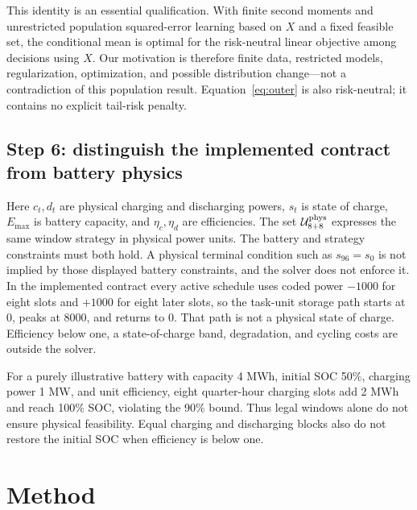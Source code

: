 \documentclass[11pt,a4paper]{article}
\begin{document}
\EqBayes
This identity is an essential qualification. With finite second moments and unrestricted population squared-error learning based on $X$ and a fixed feasible set, the conditional mean is optimal for the risk-neutral linear objective among decisions using $X$. Our motivation is therefore finite data, restricted models, regularization, optimization, and possible distribution change---not a contradiction of this population result. Equation~\eqref{eq:outer} is also risk-neutral; it contains no explicit tail-risk penalty.

\subsection{Step 6: distinguish the implemented contract from battery physics}
\EqPhysical
Here $c_t,d_t$ are physical charging and discharging powers, $s_t$ is state of charge, $E_{\max}$ is battery capacity, and $\eta_c,\eta_d$ are efficiencies. The set $\mathcal U_{8+8}^{\rm phys}$ expresses the same window strategy in physical power units. The battery and strategy constraints must both hold. A physical terminal condition such as $s_{96}=s_0$ is not implied by those displayed battery constraints, and the solver does not enforce it. In the implemented contract every active schedule uses coded power $-1000$ for eight slots and $+1000$ for eight later slots, so the task-unit storage path starts at 0, peaks at 8000, and returns to 0. That path is not a physical state of charge. Efficiency below one, a state-of-charge band, degradation, and cycling costs are outside the solver.

For a purely illustrative battery with capacity 4 MWh, initial SOC 50\%, charging power 1 MW, and unit efficiency, eight quarter-hour charging slots add 2 MWh and reach 100\% SOC, violating the 90\% bound. Thus legal windows alone do not ensure physical feasibility. Equal charging and discharging blocks also do not restore the initial SOC when efficiency is below one.

\section{Method}
\end{document}
